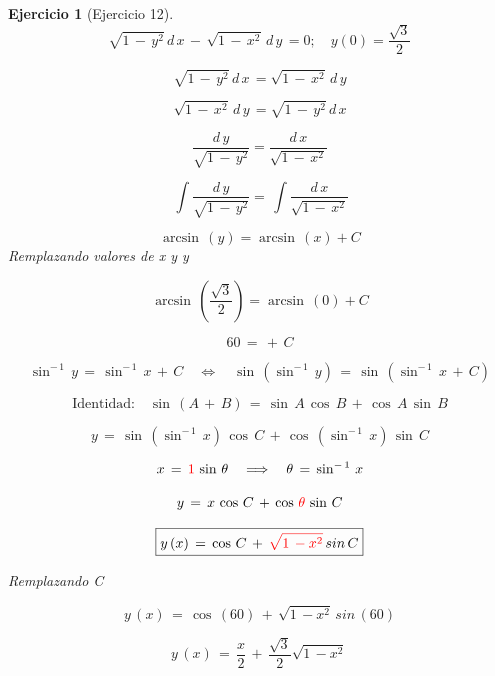 \documentclass[a4paper,11pt]{book}
\newtheorem{ejer}{Ejercicio}[section]
\begin{document}
\begin{ejer}[Ejercicio 12] 

  $$\sqrt{1\,-\,y^{2}}\,d\,x\,-\,\sqrt{1\,-\,x^{2}}\,d\,y\,= 0; \quad y(0)=\dfrac{\sqrt{3}}{2}  $$  
 
 $$\sqrt{1\,-\,y^{2}}\,d\,x\,= \sqrt{1\,-\,x^{2}}\,d\,y $$
 
 $$\sqrt{1\,-\,x^{2}}\,d\,y\,= \sqrt{1\,-\,y^{2}}\,d\,x $$
 
 $$ \dfrac{d\,y}{\sqrt{1\,-\,y^{2}}} = \dfrac{d\,x}{\sqrt{1\,-\,x^{2}}} $$
 
   $$\displaystyle\,\int \dfrac{d\,y}{\sqrt{1\,-\,y^{2}}} = \displaystyle\,\int \dfrac{d\,x}{\sqrt{1\,-\,x^{2}}} $$

   $$ \arcsin\,(y) = \arcsin\,(x) + C$$
 Remplazando valores de x y y
 
 $$ \arcsin\,(\dfrac{\sqrt{3}}{2}) = \arcsin\,(0) + C$$

 $$ 60\,=\,+\,C$$

$$\sin^{-\,1}\,y\,=\,\sin^{-\,1}\,x\,+\,C \quad \iff \quad \sin\,(\sin^{-\,1}\,y)\,=\,\sin\,(\sin^{-\,1}\,x\,+\,C)$$

$$\text{Identidad:} \quad \sin\,(A\,+\,B)\,=\,\sin\,A\,\cos\,B\,+\,\cos\,A\,\sin\,B$$

$$y\,=\,\sin\,(\sin^{-\,1}\,x)\,\cos\,C\,+\,\cos\,(\sin^{-\,1}\,x)\,\sin\,C$$

 $$x\,=\,\textcolor{red}{1}\,\sin\,\theta \quad \Longrightarrow \quad \theta\,=\,\sin^{-\,1}\,x$$

$$y\,=\,x\,\cos\,C\,+\,\cos\,\textcolor{red}{\theta}\,\sin\,C$$

$$ \boxed{y\,(x)\,=\,\cos\,C\,+\,\textcolor{red}{\sqrt{1\,-x^{2}}}\,sin\,C} $$

Remplazando C

$$ y\,(x)\,=\,\cos\,(60)\,+\,\sqrt{1\,-x^{2}}\,sin\,(60) $$

$$ \boxed{y\,(x)\,=\,\dfrac{x}{2}\,+\, \dfrac{\sqrt{3}}{2} \sqrt{1\,-x^{2}}\, }$$

\end{ejer} 
\end{document}
